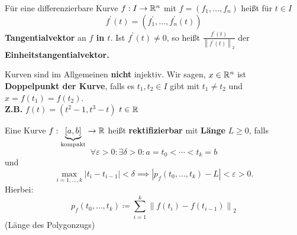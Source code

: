 \begin{definition}
	Für eine differenzierbare Kurve $ f : I \to \mathbb{R} ^n $ mit $ f = (f_1, \dotsc, f_n) $ heißt für $ t \in I $ 
	\[
		f ^\prime (t) = \left( f_1^\prime , \dotsc, f_n^\prime (t) \right) 
	\]
	\textbf{Tangentialvektor} an \textbf{$ f $ in $ t $}.
	Ist $ f^\prime (t) \neq 0 $, so heißt $ \frac{ f^\prime (t) }{ \left\| f^\prime (t) \right\| _2 }  $ der \textbf{Einheitstangentialvektor.}
\end{definition}

\begin{example}
	Kurven sind im Allgemeinen \textbf{nicht} injektiv. Wir sagen, $ x \in \mathbb{R} ^n $ ist \textbf{Doppelpunkt der Kurve}, falls es $ t_1, t_2 \in I $ gibt mit $ t_1 \neq t_2 $ und $ x = f(t_1) = f(t_2) $.\\
	\textbf{Z.B.} $ f(t) = (t^2 - 1, t^3 - t) $ $ t \in \mathbb{R}  $ 
\end{example}

\begin{definition}
	Eine Kurve $ f : \underbrace{[a, b]}_{\text{kompakt} }\to \mathbb{R}  $ heißt \textbf{rektifizierbar} mit \textbf{Länge} $ L \geq 0 $, falls
	\[
		\forall  \varepsilon > 0 : \exists \delta > 0 : a = t_0 < \dotsb < t_k = b
	\]
	und
	\[
		\max_{i = 1, \dotsc, k} \left| t_i - t_{i-1}  \right| < \delta \implies \left| p_f (t_0, \dotsc, t_k) - L \right| < \varepsilon > 0.
	\]
	Hierbei:
	\[
		p_f(t_0, \dotsc, t_k) \coloneqq \sum_{i=1}^{k} \left\| f(t_i) - f(t_{i-1} ) \right\| _2
	\]
	(Länge des Polygonzugs)
\end{definition}

